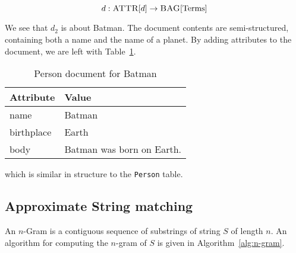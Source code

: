 		$$d:\textsc{ATTR}\lbrack d\rbrack \to \textsc{BAG}\lbrack \mathrm{Terms}\rbrack$$
		
		\begin{ex}
			We see that $d_2$ is about Batman.  The document contents are semi-structured, containing both a name and the name of a planet.  By adding attributes to the document, we are left with Table~\ref{tbl:person-document}.
			
			\begin{table}[!ht]
				\centering
				
				\begin{tabular}{ll}
					\toprule
					Attribute & Value \\
					\midrule
					name & Batman \\
					birthplace & Earth \\
					body & Batman was born on Earth. \\
					\bottomrule
				\end{tabular}
				
				\caption{Person document for Batman}
				\label{tbl:person-document}
			\end{table}
			
			which is similar in structure to the \texttt{Person} table.
		\end{ex}
		
	\subsection{Approximate String matching}
	\label{sec:n-gram}
		\begin{defn}[N-Gram]
			An $n$-Gram is a contiguous sequence of substrings of string $S$ of length $n$.  An algorithm for computing the $n$-gram of $S$ is given in Algorithm~\ref{alg:n-gram}.
		\end{defn}
		


